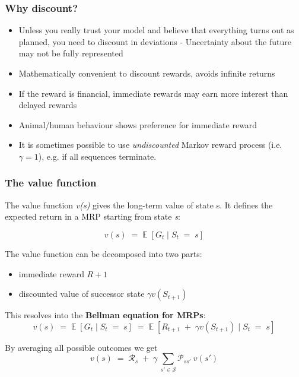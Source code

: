 \documentclass[10pt]{article}
\begin{document}
\subsubsection*{Why discount?}
\begin{itemize}
\item Unless you really trust your model and believe that everything turns out as planned, you need to discount in deviations - Uncertainty about the future may not be fully represented
\item Mathematically convenient to discount rewards, avoids infinite returns
\item If the reward is financial, immediate rewards may earn more interest than delayed rewards
\item Animal/human behaviour shows preference for immediate reward
\item It is sometimes possible to use \textit{undiscounted} Markov reward process (i.e. $\gamma = 1$), e.g. if all sequences terminate.
\end{itemize}

\subsubsection*{The value function}

The value function \textit{v(s)} gives the long-term value of state s. It defines the expected return in a MRP starting from state \textit{s}:

\begin{equation}
v(s) \; = \; \mathbb{E}\;[G_{t} \; | \; S_{t} \; = \; s]
\end{equation}

The value function can be decomposed into two parts:

\begin{itemize}
\item immediate reward $R+1$
\item discounted value of successor state $\gamma v(S_{t+1})$
\end{itemize}

This resolves into the \textbf{Bellman equation for MRPs}:
\begin{equation}
v(s) \; = \; \mathbb{E}\;[G_{t} \; | \; S_{t} \; = \; s] \; = \; \mathbb{E}\;[R_{t+1} \; + \; \gamma v(S_{t+1}) \; | \; S_{t} \; = \; s]
\end{equation}

By averaging all possible outcomes we get
\begin{equation}
v(s) \; = \; \mathcal{R}_{s} \; + \; \gamma \: \sum_{s' \in \mathcal{S}} \mathcal{P}_{ss'}\:v(s')
\end{equation}
\end{document}

